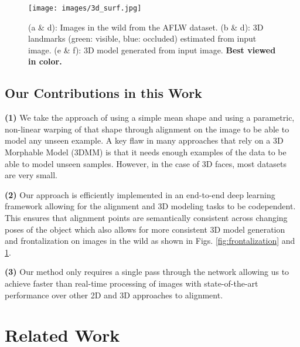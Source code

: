 \documentclass[10pt,twocolumn,letterpaper]{article}
\begin{document}
\begin{figure}[t!]
\centering
\texttt{[image: images/3d\_surf.jpg]}
\caption{(a \& d): Images in the wild from the AFLW dataset. (b \& d): 3D landmarks (green: visible, blue: occluded) estimated from input image. (e \&  f): 3D model generated from input image. \textbf{Best viewed in color.}}
\label{fig:3d_surf}
\end{figure}

\subsection{Our Contributions in this Work}
\textbf{(1)} We take the approach of using a simple mean shape and using a parametric, non-linear warping of that shape through alignment on the image to be able to model any unseen example. A key flaw in many approaches that rely on a 3D Morphable Model (3DMM) is that it needs enough examples of the data to be able to model unseen samples. However, in the case of 3D faces, most datasets are very small.

\textbf{(2)} Our approach is efficiently implemented in an end-to-end deep learning framework allowing for the alignment and 3D modeling tasks to be codependent. This ensures that alignment points are semantically consistent across changing poses of the object which also allows for more consistent 3D model generation and frontalization on images in the wild as shown in Figs. \ref{fig:frontalization} and \ref{fig:3d_surf}. 

\textbf{(3)} Our method only requires a single pass through the network allowing us to achieve faster than real-time processing of images with state-of-the-art performance over other 2D and 3D approaches to alignment.
\section{Related Work}
\end{document}
